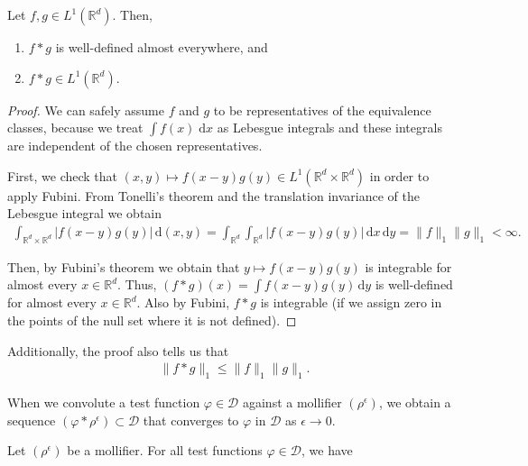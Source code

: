 \begin{lemma}
    Let \(f,g \in {L}^1(\mathbb{R}^d)\). Then, 
    \begin{enumerate}
        \item \(f*g\) is well-defined almost everywhere, and 
        \item \(f*g \in {L}^1(\mathbb{R}^d)\).
    \end{enumerate}
\end{lemma}
\begin{proof}
    We can safely assume \(f\) and \(g\) to be representatives of the equivalence classes, because we  treat \(\int f(x) \; \mathrm{d}x\) as Lebesgue integrals and these integrals are independent of the chosen representatives.

    First, we check that \((x,y) \mapsto f(x-y)g(y) \in L^1(\mathbb{R}^d \times \mathbb{R}^d)\) in order to apply Fubini. From Tonelli's theorem and the translation invariance of the Lebesgue integral we obtain
    \begin{align*}
        \int_{\mathbb{R}^d \times \mathbb{R}^d}|f(x-y)g(y)| \, \mathrm{d}(x,y) = \int_{\mathbb{R}^d}\int_{\mathbb{R}^d} |f(x-y)g(y)| \, \mathrm{d}x \, \mathrm{d}y = \lVert f \rVert_{1} \lVert g \rVert_{1} < \infty.
    \end{align*}

    Then, by Fubini's theorem we obtain that \(y \mapsto f(x-y)g(y)\) is integrable for almost every \(x \in \mathbb{R}^d\). Thus, \((f*g)(x) = \int f(x-y)g(y) \, \mathrm{d}y\) is well-defined for almost every \(x \in \mathbb{R}^d\). Also by Fubini, \(f*g\) is integrable (if we assign zero in the points of the null set where it is not defined).
\end{proof}
Additionally, the proof also tells us that
\begin{align}
    \lVert f*g \rVert_1 \leq \lVert f \rVert_{1} \lVert g \rVert_{1}.
\end{align}

When we convolute a test function \(\varphi \in \mathcal{D}\) against a mollifier \((\rho^\epsilon)\), we obtain a sequence \((\varphi * \rho^\epsilon) \subset \mathcal{D}\) that converges to \({\varphi}\) in \(\mathcal{D}\) as \(\epsilon \to 0\).  

\begin{lemma}\label{mollifier-lemma}
    Let \((\rho^\epsilon)\) be a mollifier. For all test functions \(\varphi \in \mathcal{D}\), we have
\end{lemma}

